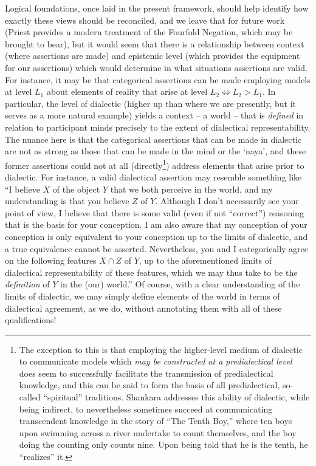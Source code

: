\documentclass[pra,twocolumn,groupedaddress,10pt]{revtex4}
\theoremstyle{definition}
\begin{document}
\begin{enumerate}[label={[\textbf{\arabic*}]},start=0]
		Logical foundations, once laid in the present framework, should help identify how exactly these views should be reconciled, and we leave that for future work (Priest\cite{priest} provides a modern treatment of the Fourfold Negation, which may be brought to bear), but it would seem that there is a relationship between context (where assertions are made) and epistemic level (which provides the equipment for our assertions) which would determine in what situations assertions are valid. For instance, it may be that categorical assertions can be made employing models at level $L_{1}$ about elements of reality that arise at level $L_{2} \iff L_{2} > L_{1}$. In particular, the level of dialectic (higher up than where we are presently, but it serves as a more natural example) yields a context -- a world -- that is \emph{defined} in relation to participant minds precisely to the extent of dialectical representability. The nuance here is that the categorical assertions that can be made in dialectic are not as strong as those that can be made in the mind or the `naya', and these former assertions could not at all (directly\footnote{The exception to this is that employing the higher-level medium of dialectic to communicate models which \emph{may be constructed at a predialectical level} does seem to successfully facilitate the transmission of predialectical knowledge, and this can be said to form the basis of all predialectical, so-called ``spiritual'' traditions. Shankara\cite{shankara} addresses this ability of dialectic, while being indirect, to nevertheless sometimes succeed at communicating transcendent knowledge in the story of ``The Tenth Boy,'' where ten boys upon swimming across a river undertake to count themselves, and the boy doing the counting only counts nine. Upon being told that he is the tenth, he ``realizes'' it.}) address elements that arise prior to dialectic. For instance, a valid dialectical assertion may resemble something like ``I believe $X$ of the object $Y$ that we both perceive in the world, and my understanding is that you believe $Z$ of $Y$. Although I don't necessarily see your point of view, I believe that there is some valid (even if not ``correct'') reasoning that is the basis for your conception. I am also aware that my conception of your conception is only equivalent to your conception up to the limits of dialectic, and a true equivalence cannot be asserted. Nevertheless, you and I categorically agree on the following features $X \cap Z$ of $Y$, up to the aforementioned limits of dialectical representability of these features, which we may thus take to be the \emph{definition} of $Y$ in the (our) world.'' Of course, with a clear understanding of the limits of dialectic, we may simply define elements of the world in terms of dialectical agreement, as we do, without annotating them with all of these qualifications!


\end{enumerate}
\end{document}
